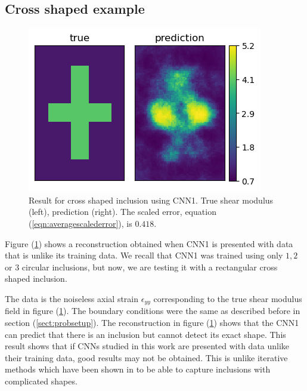 \documentclass[12pt]{article}
\newcommand{\nhgtotalheight}{4cm}
\begin{document}
\subsection{\label{sect:resultscross} Cross shaped example}
%
\begin{figure}[!h]
  \centering
  \includegraphics[totalheight=\nhgtotalheight]{Figures/ResultCross/mu.png}
  \caption{\label{fig:resultcross} Result for cross shaped inclusion using CNN1. True shear modulus (left), prediction (right). The scaled error, equation (\ref{eqn:averagescalederror}), is $0.418$.}
\end{figure}
%
Figure (\ref{fig:resultcross}) shows a reconstruction obtained when CNN1 is presented with data that is unlike its training data. We recall that CNN1 was trained using only $1,2$ or $3$ circular inclusions, but now, we are testing it with a rectangular cross shaped inclusion.

The data is the noiseless axial strain $\epsilon_{yy}$ corresponding to the true shear modulus field in figure (\ref{fig:resultcross}). The boundary conditions were the same as described before in section (\ref{sect:probsetup}). The reconstruction in figure (\ref{fig:resultcross}) shows that the CNN1 can predict that there is an inclusion but cannot detect its exact shape. This result shows that if CNNs studied in this work are presented with data unlike their training data, good results may not be obtained. This is unlike iterative methods which have been shown in \cite{paper:oberaipmb2004} to be able to capture inclusions with complicated shapes.
\end{document}
